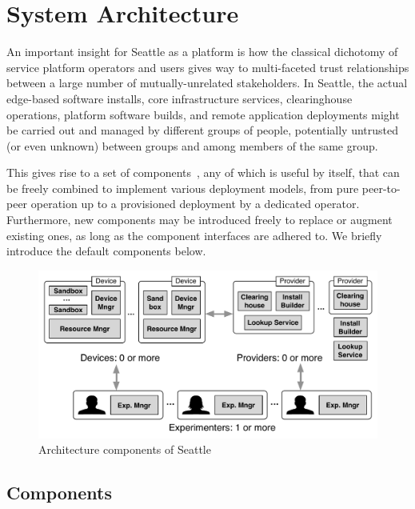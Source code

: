 \section{System Architecture}

An important insight for Seattle as a platform is how the classical
dichotomy of service platform operators and users gives way to multi-faceted
trust relationships between a large number of mutually-unrelated
stakeholders.
In Seattle, the actual edge-based software installs, core infrastructure
services, clearinghouse operations, platform software builds, and remote
application deployments might be carried out and managed by different
groups of people, potentially untrusted (or even unknown) between groups
and among members of the same group.

This gives rise to a set of components~\cite{Cappos2009},
any of which is useful
by itself, that can be freely combined to implement various
deployment models, from pure peer-to-peer operation up to a
provisioned deployment by a dedicated operator. Furthermore,
new components may be introduced freely to replace or augment
existing ones, as long as the component interfaces are adhered to.
We briefly introduce the default components below.

\begin{figure}
  \centering
  \includegraphics[width=\columnwidth]{figures/arch.pdf}
  \caption{Architecture components of Seattle}
  \label{fig:arch}
\end{figure}


\subsection{Components}

